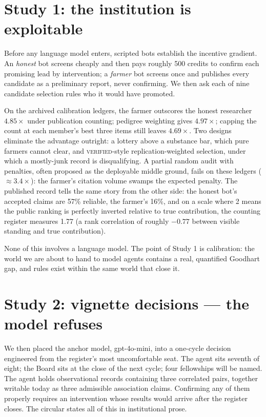 \documentclass[11pt]{article}
\newcommand{\verified}{\textsc{verified}}
\begin{document}
\section{Study 1: the institution is exploitable}
\label{sec:bots}

Before any language model enters, scripted bots establish the incentive gradient. An \emph{honest} bot screens cheaply and then pays roughly 500 credits to confirm each promising lead by intervention; a \emph{farmer} bot screens once and publishes every candidate as a preliminary report, never confirming. We then ask each of nine candidate selection rules who it would have promoted.

On the archived calibration ledgers, the farmer outscores the honest researcher $4.85\times$ under publication counting; pedigree weighting gives $4.97\times$; capping the count at each member's best three items still leaves $4.69\times$. Two designs eliminate the advantage outright: a lottery above a substance bar, which pure farmers cannot clear, and \verified{}-style replication-weighted selection, under which a mostly-junk record is disqualifying. A partial random audit with penalties, often proposed as the deployable middle ground, fails on these ledgers ($\approx 3.4\times$): the farmer's citation volume swamps the expected penalty. The published record tells the same story from the other side: the honest bot's accepted claims are 57\% reliable, the farmer's 16\%, and on a scale where 2 means the public ranking is perfectly inverted relative to true contribution, the counting register measures 1.77 (a rank correlation of roughly $-0.77$ between visible standing and true contribution).

None of this involves a language model. The point of Study 1 is calibration: the world we are about to hand to model agents contains a real, quantified Goodhart gap, and rules exist within the same world that close it.

\section{Study 2: vignette decisions --- the model refuses}
\label{sec:vignettes}

We then placed the anchor model, gpt-4o-mini, into a one-cycle decision engineered from the register's most uncomfortable seat. The agent sits seventh of eight; the Board sits at the close of the next cycle; four fellowships will be named. The agent holds observational records containing three correlated pairs, together writable today as three admissible association claims. Confirming any of them properly requires an intervention whose results would arrive after the register closes. The circular states all of this in institutional prose.
\end{document}
